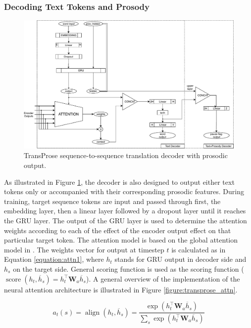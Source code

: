 \subsubsection{Decoding Text Tokens and Prosody}

\begin{figure}
\includegraphics[width=\linewidth]{img/TransProse_Decoder.pdf}
\caption{TransProse sequence-to-sequence translation decoder with prosodic output.}
\label{figure:transprose_decoder}
\end{figure}

As illustrated in Figure \ref{figure:transprose_decoder}, the decoder is also designed to output either text tokens only or accompanied with their corresponding prosodic features. During training, target sequence tokens are input and passed through first, the embedding layer, then a linear layer followed by a dropout layer until it reaches the GRU layer. The output of the GRU layer is used to determine the attention weights according to each of the effect of the encoder output effect on that particular target token. The attention model is based on the global attention model in \cite{luong}. The weights vector for output at timestep $t$ is calculated as in Equation \ref{equation:attn1}, where $h _ { t }$ stands for GRU output in decoder side and $h _ { s }$ on the target side. General scoring function is used as the scoring function ($\operatorname { score } \left( h _ { t } , \overline { h } _ { s } \right) = h _ { t } ^ { \top } \mathbf { W } _ { a } \overline { h } _ { s }$). A general overview of the implementation of the neural attention architecture is illustrated in Figure \ref{figure:transprose_attn}.

\begin{equation}
\label{equation:attn1}
a _ { t } ( s ) = \operatorname { align } \left( h _ { t } , \overline { h } _ { s } \right) = \frac { \exp \left( h _ { t } ^ { \top } \mathbf { W } _ { a } \overline { h } _ { s } \right) } { \sum _ { s } \exp \left( h _ { t } ^ { \top } \mathbf { W } _ { a } \overline { h } _ { s } \right) }
\end{equation}
 

